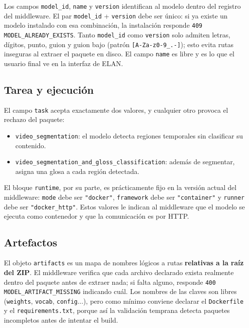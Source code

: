\documentclass[12pt,a4paper]{article}
\begin{document}
Los campos \texttt{model\_id}, \texttt{name} y \texttt{version} identifican al modelo dentro del registro del middleware. El par \texttt{model\_id} + \texttt{version} debe ser único: si ya existe un modelo instalado con esa combinación, la instalación responde \texttt{409 MODEL\_ALREADY\_EXISTS}. Tanto \texttt{model\_id} como \texttt{version} solo admiten letras, dígitos, punto, guion y guion bajo (patrón \texttt{[A-Za-z0-9\_.-]}); esto evita rutas inseguras al extraer el paquete en disco. El campo \texttt{name} es libre y es lo que el usuario final ve en la interfaz de ELAN.

\subsection{Tarea y ejecución}

El campo \texttt{task} acepta exactamente dos valores, y cualquier otro provoca el rechazo del paquete:

\begin{itemize}[noitemsep, topsep=2pt]
    \item \texttt{video\_segmentation}: el modelo detecta regiones temporales sin clasificar su contenido.
    \item \texttt{video\_segmentation\_and\_gloss\_classification}: además de segmentar, asigna una glosa a cada región detectada.
\end{itemize}

El bloque \texttt{runtime}, por su parte, es prácticamente fijo en la versión actual del middleware: \texttt{mode} debe ser \texttt{"docker"}, \texttt{framework} debe ser \texttt{"container"} y \texttt{runner} debe ser \texttt{"docker\_http"}. Estos valores le indican al middleware que el modelo se ejecuta como contenedor y que la comunicación es por HTTP.

\subsection{Artefactos}

El objeto \texttt{artifacts} es un mapa de nombres lógicos a rutas \textbf{relativas a la raíz del ZIP}. El middleware verifica que cada archivo declarado exista realmente dentro del paquete antes de extraer nada; si falta alguno, responde \texttt{400 MODEL\_ARTIFACT\_MISSING} indicando cuál. Los nombres de las claves son libres (\texttt{weights}, \texttt{vocab}, \texttt{config}...), pero como mínimo conviene declarar el \texttt{Dockerfile} y el \texttt{requirements.txt}, porque así la validación temprana detecta paquetes incompletos antes de intentar el build.
\end{document}
